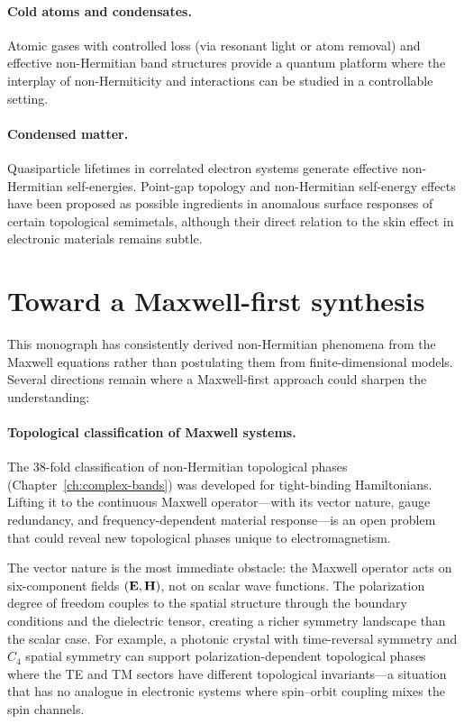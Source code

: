\paragraph{Cold atoms and condensates.}
Atomic gases with controlled loss (via resonant light or atom removal)
and effective non-Hermitian band structures provide a quantum platform
where the interplay of non-Hermiticity and interactions can be studied
in a controllable setting.

\paragraph{Condensed matter.}
Quasiparticle lifetimes in correlated electron systems generate effective
non-Hermitian self-energies. Point-gap topology and non-Hermitian
self-energy effects have been proposed as possible ingredients in
anomalous surface responses of certain topological semimetals, although
their direct relation to the skin effect in electronic materials remains
subtle.


\section{Toward a Maxwell-first synthesis}
\label{sec:maxwell-synthesis}

This monograph has consistently derived non-Hermitian phenomena from the
Maxwell equations rather than postulating them from finite-dimensional
models. Several directions remain where a Maxwell-first approach could
sharpen the understanding:

\paragraph{Topological classification of Maxwell systems.}
The 38-fold classification of non-Hermitian topological phases
(Chapter~\ref{ch:complex-bands}) was developed for tight-binding
Hamiltonians. Lifting it to the continuous Maxwell operator---with its
vector nature, gauge redundancy, and frequency-dependent material
response---is an open problem that could reveal new topological phases
unique to electromagnetism.

The vector nature is the most immediate obstacle: the Maxwell operator
acts on six-component fields $(\mathbf{E}, \mathbf{H})$, not on scalar wave functions.
The polarization degree of freedom couples to the spatial structure
through the boundary conditions and the dielectric tensor, creating a
richer symmetry landscape than the scalar case. For example, a photonic
crystal with time-reversal symmetry and $C_4$ spatial symmetry can
support polarization-dependent topological phases where the TE and TM
sectors have different topological invariants---a situation that has no
analogue in electronic systems where spin--orbit coupling mixes the
spin channels.

